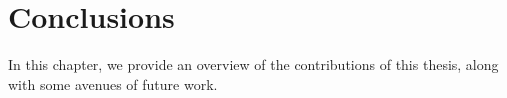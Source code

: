 \chapter{Conclusions \label{conclusions}}

In this chapter, we provide an overview of the contributions of this thesis, along with some avenues of future work.

